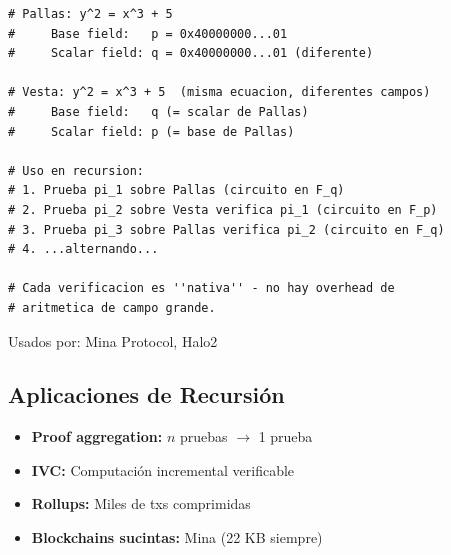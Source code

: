 \documentclass[11pt,a4paper,twoside]{book}
\begin{document}
\begin{example}
\begin{lstlisting}[style=python]
# Pallas: y^2 = x^3 + 5
#     Base field:   p = 0x40000000...01
#     Scalar field: q = 0x40000000...01 (diferente)

# Vesta: y^2 = x^3 + 5  (misma ecuacion, diferentes campos)
#     Base field:   q (= scalar de Pallas)
#     Scalar field: p (= base de Pallas)

# Uso en recursion:
# 1. Prueba pi_1 sobre Pallas (circuito en F_q)
# 2. Prueba pi_2 sobre Vesta verifica pi_1 (circuito en F_p)
# 3. Prueba pi_3 sobre Pallas verifica pi_2 (circuito en F_q)
# 4. ...alternando...

# Cada verificacion es ''nativa'' - no hay overhead de 
# aritmetica de campo grande.
\end{lstlisting}

Usados por: Mina Protocol, Halo2
\end{example}

\subsection{Aplicaciones de Recursi\'on}

\begin{itemize}
    \item \textbf{Proof aggregation:} $n$ pruebas $\to$ 1 prueba
    \item \textbf{IVC:} Computaci\'on incremental verificable
    \item \textbf{Rollups:} Miles de txs comprimidas
    \item \textbf{Blockchains sucintas:} Mina (22 KB siempre)
\end{itemize}
\end{document}
